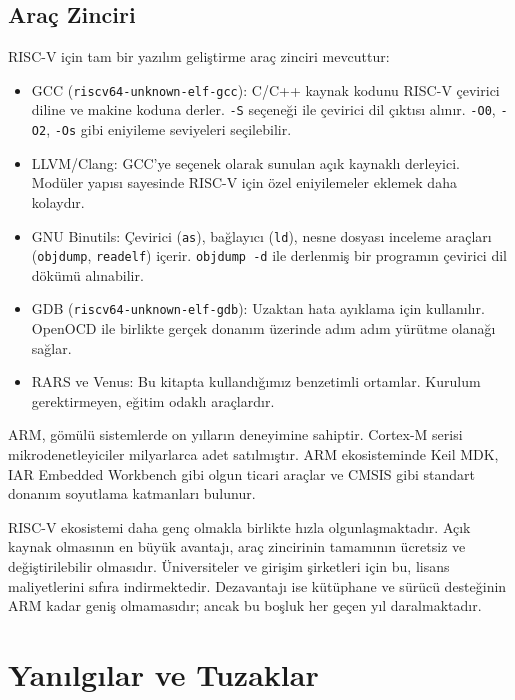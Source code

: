 \subsection{Araç Zinciri}

RISC-V için tam bir yazılım geliştirme araç zinciri mevcuttur:

\begin{itemize}
\item GCC (\texttt{riscv64-unknown-elf-gcc}): C/C++ kaynak kodunu RISC-V çevirici diline ve makine koduna derler. \texttt{-S} seçeneği ile çevirici dil çıktısı alınır. \texttt{-O0}, \texttt{-O2}, \texttt{-Os} gibi eniyileme seviyeleri seçilebilir.
\item LLVM/Clang: GCC'ye seçenek olarak sunulan açık kaynaklı derleyici. Modüler yapısı sayesinde RISC-V için özel eniyilemeler eklemek daha kolaydır.
\item GNU Binutils: Çevirici (\texttt{as}), bağlayıcı (\texttt{ld}), nesne dosyası inceleme araçları (\texttt{objdump}, \texttt{readelf}) içerir. \texttt{objdump -d} ile derlenmiş bir programın çevirici dil dökümü alınabilir.
\item GDB (\texttt{riscv64-unknown-elf-gdb}): Uzaktan hata ayıklama için kullanılır. OpenOCD ile birlikte gerçek donanım üzerinde adım adım yürütme olanağı sağlar.
\item RARS ve Venus: Bu kitapta kullandığımız benzetimli ortamlar. Kurulum gerektirmeyen, eğitim odaklı araçlardır.
\end{itemize}

\begin{karsilastirma}
ARM, gömülü sistemlerde on yılların deneyimine sahiptir. Cortex-M serisi mikrodenetleyiciler milyarlarca adet satılmıştır. ARM ekosisteminde Keil MDK, IAR Embedded Workbench gibi olgun ticari araçlar ve CMSIS gibi standart donanım soyutlama katmanları bulunur.

RISC-V ekosistemi daha genç olmakla birlikte hızla olgunlaşmaktadır. Açık kaynak olmasının en büyük avantajı, araç zincirinin tamamının ücretsiz ve değiştirilebilir olmasıdır. Üniversiteler ve girişim şirketleri için bu, lisans maliyetlerini sıfıra indirmektedir. Dezavantajı ise kütüphane ve sürücü desteğinin ARM kadar geniş olmamasıdır; ancak bu boşluk her geçen yıl daralmaktadır.
\end{karsilastirma}


\section{Yanılgılar ve Tuzaklar}
\label{sec:yanilgilar-programlama}

